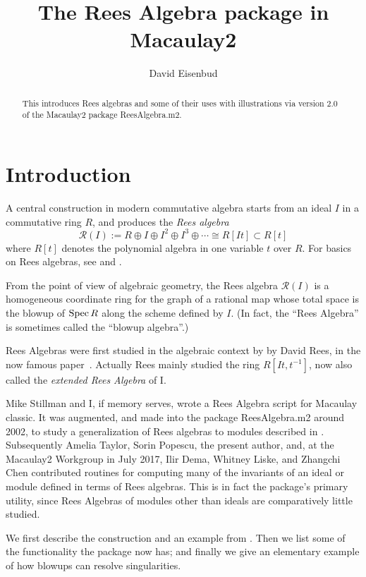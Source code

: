\documentclass[twoside,12pt, leqno]{amsart}
\author{David Eisenbud}
\title{The Rees Algebra package in Macaulay2}
\def\RR{{\mathcal R}}
\def\Spec{{{\rm Spec}\,}}
\begin{document}
\begin{abstract}
This introduces Rees algebras and some of their uses with illustrations via version 2.0 of the Macaulay2 package ReesAlgebra.m2.
\end{abstract}

\maketitle

\section*{Introduction}
A central construction in modern commutative algebra starts from
an ideal $I$ in a commutative ring $R$, and produces the \emph{Rees algebra}
$$
\RR(I) :=  R\oplus I\oplus I^2\oplus I^3\oplus\cdots \cong R[It]\subset R[t]
$$ 
where $R[t]$ denotes the polynomial algebra in one variable $t$ over $R$. For basics on Rees algebras, see \cite{V} and \cite{SW}.

From the point of view of algebraic geometry, the Rees algebra $\RR(I)$ is a homogeneous
coordinate ring for the graph of a rational map whose total space is the blowup
of $\Spec R$ along the scheme defined by $I$.
 (In fact, the  ``Rees Algebra'' is sometimes called the ``blowup algebra''.)  
     

     Rees Algebras were first studied in the algebraic context by
      by David Rees, in the
     now famous paper~\cite{Rees}. Actually
     Rees mainly studied the ring 
     $R[It,t^{-1}]$, now also called the \emph{extended Rees
     Algebra} of I. 
     
Mike Stillman and I, if memory serves, wrote a Rees Algebra script for Macaulay classic. It was augmented, and made into the package ReesAlgebra.m2  around 2002,  to study a generalization of Rees algebras to modules described in \cite{EHU}. Subsequently
Amelia Taylor, 
Sorin Popescu, the present author,
and, at the Macaulay2 Workgroup in July 2017, 
Ilir Dema,
Whitney Liske, and
Zhangchi Chen
contributed routines
for computing many of the invariants of an ideal or module
defined in terms of Rees algebras. This is in fact the package's primary utility, since Rees Algebras
of modules other than ideals are comparatively little studied. 

We first describe the construction and an example from \cite{EHU}. Then we list some of the functionality the package now has; and finally we give an elementary example of how blowups can resolve singularities.
\end{document}

